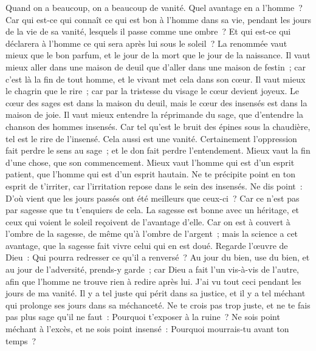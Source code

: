 \begin{multicols}{2}
Quand on a beaucoup, on a beaucoup de vanité. Quel avantage en a l'homme~? 
Car qui est-ce qui connaît ce qui est bon à l'homme dans sa vie, pendant les jours de la vie de sa vanité, lesquels il passe comme une ombre~? Et qui est-ce qui déclarera à l'homme ce qui sera après lui sous le soleil~?
\VerseOne{}La renommée vaut mieux que le bon parfum, et le jour de la mort que le jour de la naissance.
Il vaut mieux aller dans une maison de deuil que d'aller dans une maison de festin~; car c'est là la fin de tout homme, et le vivant met cela dans son cœur.
Il vaut mieux le chagrin que le rire~; car par la tristesse du visage le cœur devient joyeux.
Le cœur des sages est dans la maison du deuil, mais le cœur des insensés est dans la maison de joie.
Il vaut mieux entendre la réprimande du sage, que d'entendre la chanson des hommes insensés.
Car tel qu'est le bruit des épines sous la chaudière, tel est le rire de l'insensé. Cela aussi est une vanité. 
Certainement l'oppression fait perdre le sens au sage~; et le don fait perdre l'entendement. 
Mieux vaut la fin d'une chose, que son commencement. Mieux vaut l'homme qui est d'un esprit patient, que l'homme qui est d'un esprit hautain. 
Ne te précipite point en ton esprit de t'irriter, car l'irritation repose dans le sein des insensés.
Ne dis point~: D'où vient que les jours passés ont été meilleurs que ceux-ci~? Car ce n'est pas par sagesse que tu t'enquiers de cela. 
La sagesse est bonne avec un héritage, et ceux qui voient le soleil reçoivent de l'avantage d'elle.
Car on est à couvert à l'ombre de la sagesse, de même qu'à l'ombre de l'argent~; mais la science a cet avantage, que la sagesse fait vivre celui qui en est doué. 
Regarde l'œuvre de Dieu~: Qui pourra redresser ce qu'il a renversé~?
Au jour du bien, use du bien, et au jour de l'adversité, prends-y garde~; car Dieu a fait l'un vis-à-vis de l'autre, afin que l'homme ne trouve rien à redire après lui. 
J'ai vu tout ceci pendant les jours de ma vanité. Il y a tel juste qui périt dans sa justice, et il y a tel méchant qui prolonge ses jours dans sa méchanceté.
Ne te crois pas trop juste, et ne te fais pas plus sage qu'il ne faut~: Pourquoi t'exposer à la ruine~?
Ne sois point méchant à l'excès, et ne sois point insensé~: Pourquoi mourrais-tu avant ton temps~?

\end{multicols}
